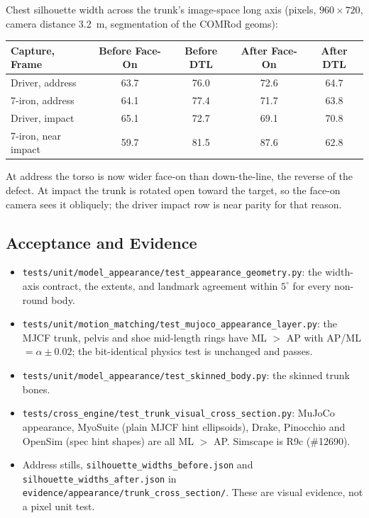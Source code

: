 Chest silhouette width across the trunk's image-space long axis (pixels,
$960\times720$, camera distance 3.2~m, segmentation of the COMRod geoms):
\begin{center}
\begin{tabular}{lcccc}
Capture, Frame & Before Face-On & Before DTL & After Face-On & After DTL \\
\hline
Driver, address & 63.7 & 76.0 & 72.6 & 64.7 \\
7-iron, address & 64.1 & 77.4 & 71.7 & 63.8 \\
Driver, impact & 65.1 & 72.7 & 69.1 & 70.8 \\
7-iron, near impact & 59.7 & 81.5 & 87.6 & 62.8 \\
\end{tabular}
\end{center}
At address the torso is now wider face-on than down-the-line, the reverse of the
defect. At impact the trunk is rotated open toward the target, so the face-on
camera sees it obliquely; the driver impact row is near parity for that reason.

\subsection{Acceptance and Evidence}
\begin{itemize}
\item \texttt{tests/unit/model\_appearance/test\_appearance\_geometry.py}: the
  width-axis contract, the extents, and landmark agreement within $5^\circ$ for
  every non-round body.
\item \texttt{tests/unit/motion\_matching/test\_mujoco\_appearance\_layer.py}: the
  MJCF trunk, pelvis and shoe mid-length rings have ML $>$ AP with
  AP/ML $=\alpha\pm0.02$; the bit-identical physics test is unchanged and passes.
\item \texttt{tests/unit/model\_appearance/test\_skinned\_body.py}: the skinned
  trunk bones.
\item \texttt{tests/cross\_engine/test\_trunk\_visual\_cross\_section.py}: MuJoCo
  appearance, MyoSuite (plain MJCF hint ellipsoids), Drake, Pinocchio and OpenSim
  (spec hint shapes) are all ML $>$ AP. Simscape is R9c (\#12690).
\item Address stills, \texttt{silhouette\_widths\_before.json} and
  \texttt{silhouette\_widths\_after.json} in
  \texttt{evidence/appearance/trunk\_cross\_section/}. These are visual evidence,
  not a pixel unit test.
\end{itemize}

